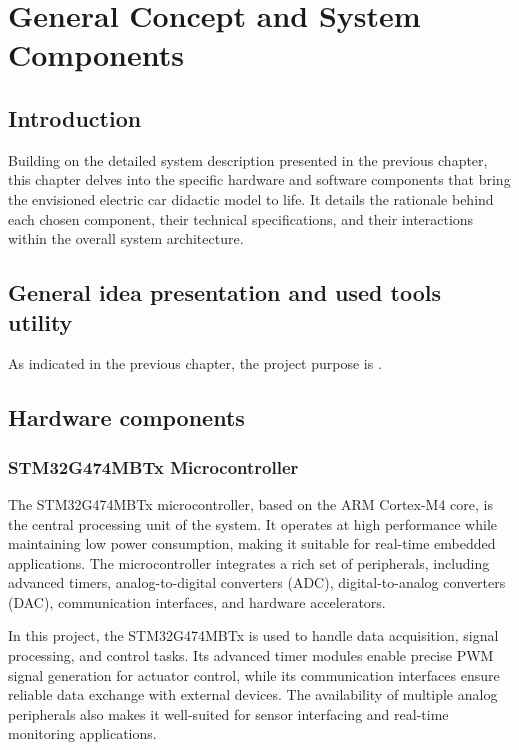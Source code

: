 \chapter{General Concept and System Components  }

\pagestyle{fancy}
\fancyhf{}
\cfoot{\thepage}

\section{Introduction}
\hspace{1cm}Building on the detailed system description presented in the previous chapter, this chapter delves into the specific hardware and software components that bring the envisioned electric car didactic model to life. It details the rationale behind each chosen component, their technical specifications, and their interactions within the overall system architecture.
\section{General idea presentation and used tools utility}
\hspace{1cm}As indicated in the previous chapter, the project purpose is .

\section{Hardware components}

\subsection{STM32G474MBTx Microcontroller}
\hspace{1cm}The STM32G474MBTx microcontroller, based on the ARM Cortex-M4 core, is the central processing unit of the system. It operates at high performance while maintaining low power consumption, making it suitable for real-time embedded applications. The microcontroller integrates a rich set of peripherals, including advanced timers, analog-to-digital converters (ADC), digital-to-analog converters (DAC), communication interfaces, and hardware accelerators.

\hspace{1cm}In this project, the STM32G474MBTx is used to handle data acquisition, signal processing, and control tasks. Its advanced timer modules enable precise PWM signal generation for actuator control, while its communication interfaces ensure reliable data exchange with external devices. The availability of multiple analog peripherals also makes it well-suited for sensor interfacing and real-time monitoring applications.


